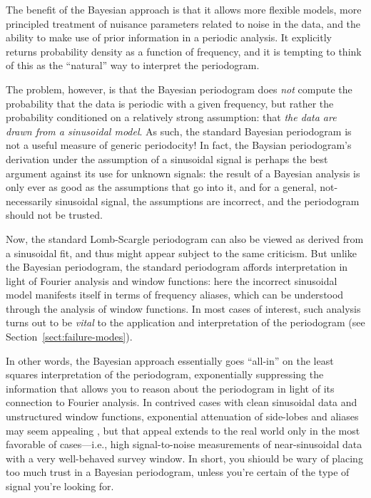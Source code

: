 \documentclass[preprint]{aastex}
\newcommand{\Sect}[1]{Section~\ref{sect:#1}}
\newcommand{\sect}[1]{\Sect{#1}}
\begin{document}
The benefit of the Bayesian approach is that it allows more flexible models,
more principled treatment of nuisance parameters related to noise in the data,
and the ability to make use of prior information in a periodic analysis.
It explicitly returns probability density as a function of frequency,
and it is tempting to think of this as the
``natural'' way to interpret the periodogram.

The problem, however, is that the Bayesian periodogram does {\it not} compute
the probability that the data is periodic with a given frequency, but rather
the probability conditioned on a relatively strong assumption:
that {\it the data are drawn from a sinusoidal model}.
As such, the standard Bayesian periodogram is not a useful measure of
generic periodocity!
In fact, the Baysian periodogram's derivation under the
assumption of a sinusoidal signal is perhaps the
best argument against its use for unknown signals:
the result of a Bayesian analysis is only ever as good as the assumptions that
go into it, and for a general, not-necessarily sinusoidal signal, the
assumptions are incorrect, and the periodogram should not be trusted.

Now, the standard Lomb-Scargle periodogram can also be viewed as derived
from a sinusoidal fit, and thus might appear subject to the same criticism.
But unlike the Bayesian periodogram, the standard periodogram affords
interpretation in light of Fourier analysis and window functions: here
the incorrect sinusoidal model manifests itself in terms of frequency
aliases, which can be understood through the analysis of window functions.
In most cases of interest, such analysis turns out to be {\it vital} to the
application and interpretation of the periodogram (see \sect{failure-modes}).

In other words, the Bayesian approach essentially
goes ``all-in'' on the least squares
interpretation of the periodogram, exponentially suppressing the information
that allows you to reason about the periodogram in light of its connection
to Fourier analysis.
In contrived cases with clean sinusoidal data and unstructured window
functions, exponential attenuation
of side-lobes and aliases may seem appealing \citep[see, e.g.][]{Mortier15},
but that appeal extends to the real world only in the most favorable of
cases---i.e., high signal-to-noise measurements of near-sinusoidal data with
a very well-behaved survey window.
In short, you shiould be wary of placing too much trust in a Bayesian
periodogram, unless you're certain of the type of signal you're looking for.
\end{document}
